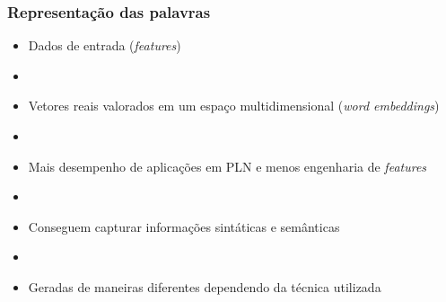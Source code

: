 \documentclass[10pt]{beamer}
\begin{document}
\begin{frame}[fragile]
  \frametitle{Representação das palavras}

  \begin{itemize}
    \item[-] Dados de entrada (\textit{features})
    
    \item[\ ] \ 

    \item[-] Vetores reais valorados em um espaço multidimensional (\textit{word embeddings})
    
    \item[\ ] \ 

    \item[-] Mais desempenho de aplicações em PLN e menos engenharia de \textit{features}

    \item[\ ] \ 

    \item[-] Conseguem capturar informações sintáticas e semânticas

    \item[\ ] \ 

    \item[-] Geradas de maneiras diferentes dependendo da técnica utilizada
  \end{itemize}
  


\end{frame}
\end{document}
